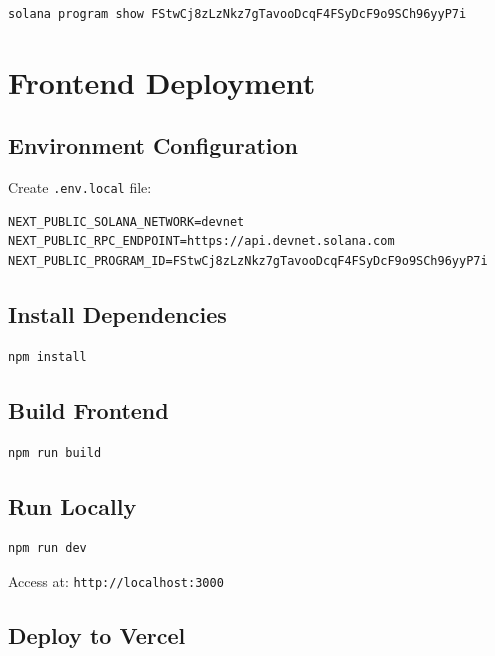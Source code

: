 \documentclass[a4paper,13pt,twoside]{report}
\theoremstyle{definition}
\begin{document}
\begin{lstlisting}[language=bash]
solana program show FStwCj8zLzNkz7gTavooDcqF4FSyDcF9o9SCh96yyP7i
\end{lstlisting}

\section{Frontend Deployment}

\subsection{Environment Configuration}

Create \texttt{.env.local} file:
\begin{lstlisting}
NEXT_PUBLIC_SOLANA_NETWORK=devnet
NEXT_PUBLIC_RPC_ENDPOINT=https://api.devnet.solana.com
NEXT_PUBLIC_PROGRAM_ID=FStwCj8zLzNkz7gTavooDcqF4FSyDcF9o9SCh96yyP7i
\end{lstlisting}

\subsection{Install Dependencies}

\begin{lstlisting}[language=bash]
npm install
\end{lstlisting}

\subsection{Build Frontend}

\begin{lstlisting}[language=bash]
npm run build
\end{lstlisting}

\subsection{Run Locally}

\begin{lstlisting}[language=bash]
npm run dev
\end{lstlisting}

Access at: \texttt{http://localhost:3000}

\subsection{Deploy to Vercel}
\end{document}
